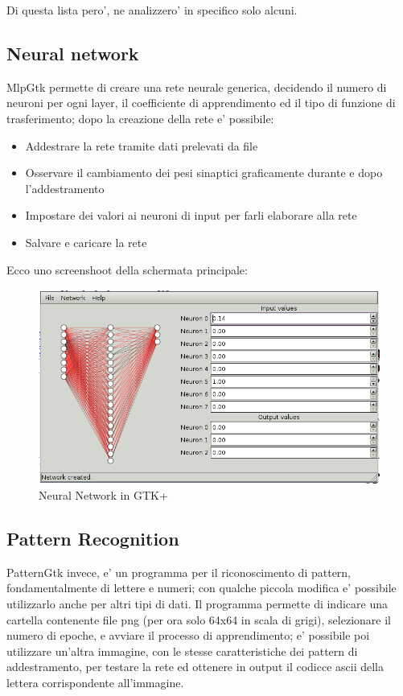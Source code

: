\documentclass[a4paper,10pt]{report}
\begin{document}
Di questa lista pero', ne analizzero' in specifico solo alcuni.

\newpage
\subsection{Neural network}
MlpGtk permette di creare una rete neurale generica, decidendo
il numero di neuroni per ogni layer, il coefficiente di apprendimento
ed il tipo di funzione di trasferimento; dopo la creazione della rete
e' possibile:

\begin{itemize}
\item Addestrare la rete tramite dati prelevati da file
\item Osservare il cambiamento dei pesi sinaptici graficamente durante 
e dopo l'addestramento
\item Impostare dei valori ai neuroni di input per farli elaborare alla rete
\item Salvare e caricare la rete
\end{itemize}

Ecco uno screenshoot della schermata principale:
\begin{figure}[!ht]
	\begin{center}	
		\includegraphics[scale=0.6]{img/screen/neuralnet1.png}
		\caption{Neural Network in GTK+}
		\label{fig: Neural Network in GTK+}
	\end{center}
\end{figure}


\newpage
\subsection{Pattern Recognition}
PatternGtk invece,  e' un programma per il riconoscimento
di pattern, fondamentalmente di lettere e numeri; con qualche
piccola modifica e' possibile utilizzarlo anche per altri tipi di dati.
Il programma permette di indicare una cartella contenente file png
(per ora solo 64x64 in scala di grigi), selezionare il numero di epoche, 
e avviare il processo di apprendimento; e' possibile poi utilizzare un'altra 
immagine, con le stesse caratteristiche dei pattern di addestramento, 
per testare la rete ed ottenere in output il codicce ascii della lettera 
corrispondente all'immagine. 
\end{document}
